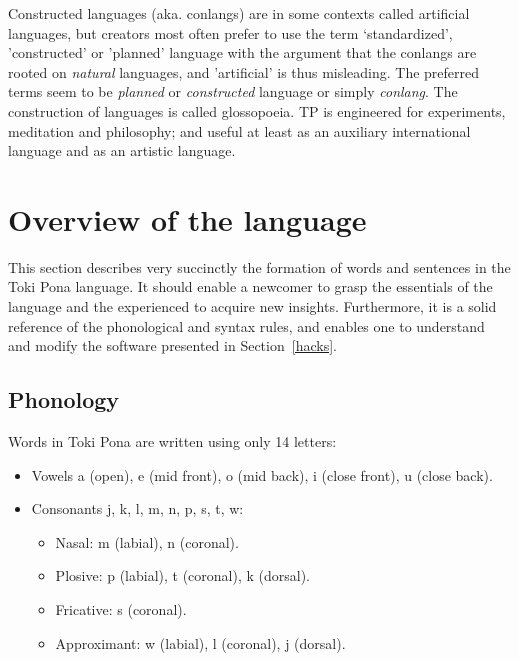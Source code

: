 Constructed languages (aka. conlangs) are in some contexts called artificial
languages, but creators most often prefer to use the term
`standardized', 'constructed'
or 'planned' language with the argument that the conlangs
are rooted on \emph{natural} languages,
and 'artificial' is thus misleading.
The preferred terms seem to be \emph{planned} or \emph{constructed} language
or simply \emph{conlang}.
The construction of languages is called glossopoeia.
TP is engineered for experiments, meditation and philosophy;
and useful at least as an auxiliary international language and
as an artistic language.~\cite{conlanWikip,artlanWikip}



\section{Overview of the language}\label{basics}
This section describes very succinctly the formation of
words and sentences in the Toki Pona language.
It should enable a newcomer to grasp the essentials
of the language and the experienced to
acquire new insights.
Furthermore, it is a solid reference of the phonological and syntax
rules, and enables one to understand and modify the software presented
in Section~\ref{hacks}.

\subsection{Phonology}\label{phonology}
Words in Toki Pona are written using only 14 letters:
\begin{itemize}
  \item Vowels a (open), e (mid front), o (mid back), i (close front),
    u (close back).
  \item Consonants j, k, l, m, n, p, s, t, w:
    \begin{itemize}
      \item Nasal: m (labial), n (coronal).
      \item Plosive: p (labial), t (coronal), k (dorsal).
      \item Fricative: s (coronal).
      \item Approximant: w (labial), l (coronal), j (dorsal).
    \end{itemize}
\end{itemize}

